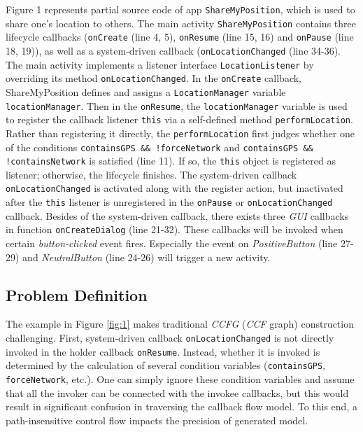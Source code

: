 Figure 1 represents partial source code of app \texttt{ShareMyPosition}, which is used to share one's location to others. The main activity \texttt{ShareMyPosition} contains three lifecycle callbacks (\texttt{onCreate} (line 4, 5), \texttt{onResume} (line 15, 16) and \texttt{onPause} (line 18, 19)), as well as a system-driven callback (\texttt{onLocationChanged} (line 34-36). The main activity implements a listener interface \texttt{LocationListener} by overriding its method \texttt{onLocationChanged}. In the \texttt{onCreate} callback, ShareMyPosition defines and assigns a \texttt{LocationManager} variable \texttt{locationManager}. Then in the \texttt{onResume}, the \texttt{locationManager} variable is used to register the callback listener \texttt{this} via a self-defined method \texttt{performLocation}. 
Rather than registering it directly, the \texttt{performLocation} first judges whether one of the conditions \texttt{containsGPS \&\& !forceNetwork} and \texttt{containsGPS \&\& !containsNetwork} is satisfied (line 11). If so, the \texttt{this} object is registered as listener; otherwise, the lifecycle finishes. The system-driven callback \texttt{onLocationChanged} is activated along with the register action, but inactivated after the \texttt{this} listener is unregistered in the \texttt{onPause} or \texttt{onLocationChanged} callback. Besides of the system-driven callback, there exists three \textit{GUI} callbacks in function \texttt{onCreateDialog} (line 21-32). These callbacks will be invoked when certain \textit{button-clicked} event fires. Especially the event on \textit{PositiveButton} (line 27-29) and \textit{NeutralButton} (line 24-26) will trigger a new activity.

 
\subsection{Problem Definition}\label{problem-define}
The example in Figure \ref{fig:1} makes traditional \textit{CCFG} (\textit{CCF} graph) construction challenging. First, system-driven callback \texttt{onLocationChanged} is not directly invoked in the holder callback \texttt{onResume}. Instead, whether it is invoked is determined by the calculation of several condition variables (\texttt{containsGPS}, \texttt{forceNetwork}, etc.). One can simply ignore these condition variables and assume that all the invoker can be connected with the invokee callbacks, but this would result in significant confusion in traversing the callback flow model. To this end, a path-insensitive control flow impacts the precision of generated model. 

